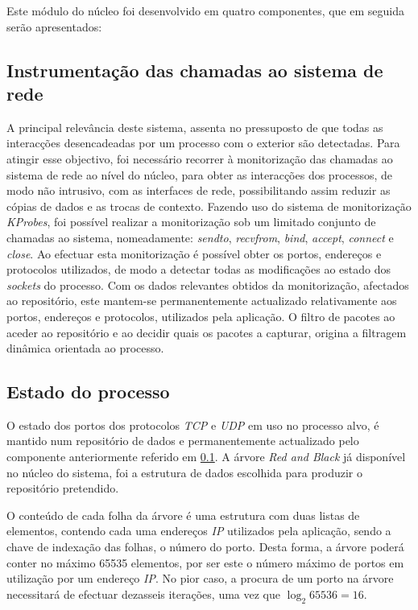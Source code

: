 Este módulo do núcleo foi desenvolvido em quatro componentes, que em seguida serão apresentados:


\subsection{Instrumentação das chamadas ao sistema de rede}
\label{sub:mon_syscalls}

A principal relevância deste sistema, assenta no pressuposto de que todas as interacções desencadeadas por um processo com o exterior são detectadas.
Para atingir esse objectivo, foi necessário recorrer à monitorização das chamadas ao sistema de rede ao nível do núcleo, para obter as interacções dos processos, de modo não intrusivo, com as interfaces de rede, possibilitando assim reduzir as cópias de dados e as trocas de contexto.
Fazendo uso do sistema de monitorização \textit{KProbes}, foi possível realizar a monitorização sob um limitado conjunto de chamadas ao sistema, nomeadamente: \textit{sendto}, \textit{recvfrom}, \textit{bind}, \textit{accept}, \textit{connect} e \textit{close}.
Ao efectuar esta monitorização é possível obter os portos, endereços e protocolos utilizados, de modo a detectar todas as modificações ao estado dos \textit{sockets} do processo.
Com os dados relevantes obtidos da monitorização, afectados ao repositório, este mantem-se permanentemente actualizado relativamente aos portos, endereços e protocolos, utilizados pela aplicação.
O filtro de pacotes ao aceder ao repositório e ao decidir quais os pacotes a capturar, origina a filtragem dinâmica orientada ao processo.


\subsection{Estado do processo}
\label{sub:data_repository}

O estado dos portos dos protocolos \textit{TCP} e \textit{UDP} em uso no processo alvo, é mantido num repositório de dados e permanentemente actualizado pelo componente anteriormente referido em \ref{sub:mon_syscalls}.
A árvore \textit{Red and Black} já disponível no núcleo do sistema, foi a estrutura de dados escolhida para produzir o repositório pretendido.

O conteúdo de cada folha da árvore é uma estrutura com duas listas de elementos, contendo cada uma endereços \textit{IP} utilizados pela aplicação, sendo a chave de indexação das folhas, o número do porto.
Desta forma, a árvore poderá conter no máximo 65535 elementos, por ser este o número máximo de portos em utilização por um endereço \textit{IP}.
No pior caso, a procura de um porto na árvore necessitará de efectuar dezasseis iterações, uma vez que \begin{math}\log _2 65536 = 16 \end{math}.

